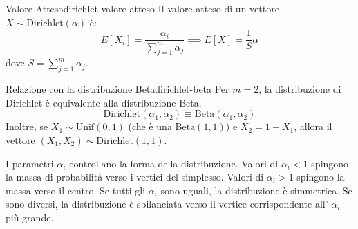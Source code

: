 \begin{proposizione}{Valore Atteso}{dirichlet-valore-atteso}
Il valore atteso di un vettore $X \sim \text{Dirichlet}(\alpha)$ è:
$$
E[X_i] = \frac{\alpha_i}{\sum_{j=1}^{m} \alpha_j} \implies E[X] = \frac{1}{S}
\alpha
$$
dove $S = \sum_{j=1}^{m} \alpha_j$.
\end{proposizione}

\begin{nota}{Relazione con la distribuzione Beta}{dirichlet-beta}
Per $m=2$, la distribuzione di Dirichlet è equivalente alla distribuzione Beta.
$$
\text{Dirichlet}(\alpha_1, \alpha_2) \equiv \text{Beta}(\alpha_1, \alpha_2)
$$
Inoltre, se $X_1 \sim \text{Unif}(0,1)$ (che è una $\text{Beta}(1,1)$) e $X_2 =
1 - X_1$, allora il vettore $(X_1, X_2) \sim \text{Dirichlet}(1, 1)$.
\end{nota}

I parametri $\alpha_i$ controllano la forma della distribuzione. Valori di
$\alpha_i < 1$ spingono la massa di probabilità verso i vertici del simplesso.
Valori di $\alpha_i > 1$ spingono la massa verso il centro. Se tutti gli
$\alpha_i$ sono uguali, la distribuzione è simmetrica. Se sono diversi, la
distribuzione è sbilanciata verso il vertice corrispondente all' $\alpha_i$
più grande.
